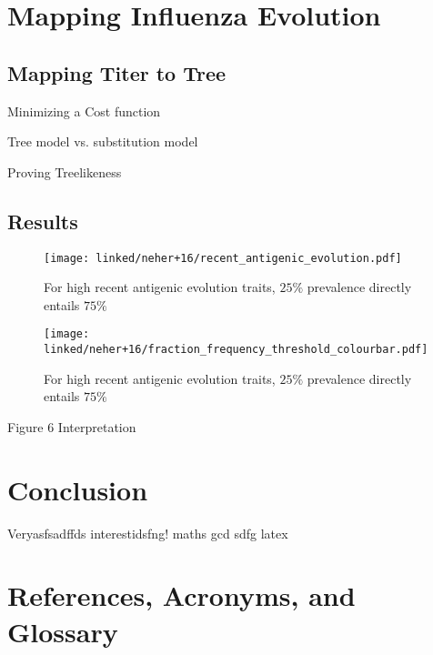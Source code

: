 \documentclass[12pt]{scrartcl}
\begin{document}
\section{Mapping Influenza Evolution}

  \subsection{Mapping Titer to Tree}

    Minimizing a Cost function

    Tree model vs. substitution model

    Proving Treelikeness

  \subsection{Results}

  \begin{figure}[h!]
    \texttt{[image: linked/neher+16/recent\_antigenic\_evolution.pdf]}
    \caption{\footnotesize For high recent antigenic evolution traits, $25\%$ prevalence directly entails $75\%$ \cite{neherBedford+16}}
  \end{figure}

  \begin{figure}[h!]
    \texttt{[image: linked/neher+16/fraction\_frequency\_threshold\_colourbar.pdf]}
    \caption{\footnotesize For high recent antigenic evolution traits, $25\%$ prevalence directly entails $75\%$ \cite{neherBedford+16}}
  \end{figure}

    Figure 6 Interpretation

\section{Conclusion}

  Veryasfsadffds interestidsfng! \gls{maths} \acrfull{gcd} sdfg \gls{latex}

\clearpage

\section{References, Acronyms, and Glossary}





\printglossary[type=\acronymtype]

\printglossary

% 

% 


\end{document}
